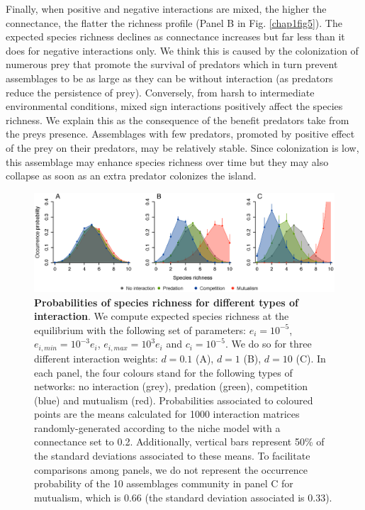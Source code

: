 Finally, when positive and negative interactions are mixed, the higher the connectance, the flatter the richness profile (Panel B in Fig. \ref{chap1fig5}). The expected species richness declines as connectance increases but far less than it does for negative interactions only. We think this is caused by the colonization of numerous prey that promote the survival of predators which in turn prevent assemblages to be as large as they can be without interaction (as predators reduce the persistence of prey). Conversely, from harsh to intermediate environmental conditions, mixed sign interactions positively affect the species richness. We explain this as the consequence of the benefit predators take from the preys presence. Assemblages with few predators, promoted by positive effect of the prey on their predators, may be relatively stable. Since colonization is low, this assemblage may enhance species richness over time but they may also collapse as soon as an extra predator colonizes the island.

\begin{figure}[h!]
\centering
\includegraphics [width=\textwidth]{./chapitre1/fig4.eps}
\caption{\textbf{Probabilities of species richness for different types of interaction}. We compute expected species richness at the equilibrium with the following set of parameters: $e_i=10^{-5}$, $e_{i,min}=10^{-3}e_i$, $e_{i,max}=10^{3}e_i$ and $c_i=10^{-5}$. We do so for three different interaction weights: $d=0.1$ (A), $d=1$ (B), $d=10$ (C). In each panel, the four colours stand for the following types of networks: no interaction (grey), predation (green), competition (blue) and mutualism (red). Probabilities associated to coloured points are the means calculated for 1000 interaction matrices randomly-generated according to the niche model \citep{Williams2000} with a connectance set to 0.2. Additionally, vertical bars represent 50\% of the standard deviations associated to these means. To facilitate comparisons among panels, we do not represent the occurrence probability of the 10 assemblages community in panel C for mutualism, which is 0.66 (the standard deviation associated is 0.33).}
\label{chap1fig4}
\end{figure}





